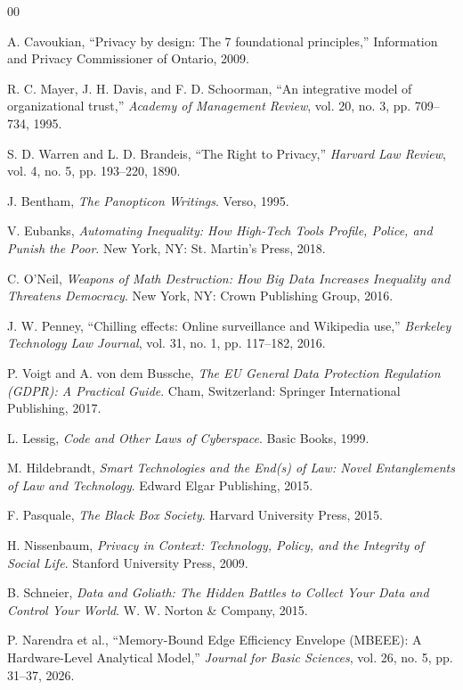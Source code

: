 \documentclass[conference]{IEEEtran}
\begin{document}
\begin{thebibliography}{00}

 A. Cavoukian, ``Privacy by design: The 7 foundational principles,'' Information and Privacy Commissioner of Ontario, 2009.

 R. C. Mayer, J. H. Davis, and F. D. Schoorman, ``An integrative model of organizational trust,'' \textit{Academy of Management Review}, vol. 20, no. 3, pp. 709--734, 1995.

 S. D. Warren and L. D. Brandeis, ``The Right to Privacy,'' \textit{Harvard Law Review}, vol. 4, no. 5, pp. 193--220, 1890.

 J. Bentham, \textit{The Panopticon Writings}. Verso, 1995.

 V. Eubanks, \textit{Automating Inequality: How High-Tech Tools Profile, Police, and Punish the Poor}. New York, NY: St. Martin's Press, 2018.

 C. O'Neil, \textit{Weapons of Math Destruction: How Big Data Increases Inequality and Threatens Democracy}. New York, NY: Crown Publishing Group, 2016.

 J. W. Penney, ``Chilling effects: Online surveillance and Wikipedia use,'' \textit{Berkeley Technology Law Journal}, vol. 31, no. 1, pp. 117--182, 2016.

 P. Voigt and A. von dem Bussche, \textit{The EU General Data Protection Regulation (GDPR): A Practical Guide}. Cham, Switzerland: Springer International Publishing, 2017.

 L. Lessig, \textit{Code and Other Laws of Cyberspace}. Basic Books, 1999.

 M. Hildebrandt, \textit{Smart Technologies and the End(s) of Law: Novel Entanglements of Law and Technology}. Edward Elgar Publishing, 2015.

 F. Pasquale, \textit{The Black Box Society}. Harvard University Press, 2015.

 H. Nissenbaum, \textit{Privacy in Context: Technology, Policy, and the Integrity of Social Life}. Stanford University Press, 2009.

 B. Schneier, \textit{Data and Goliath: The Hidden Battles to Collect Your Data and Control Your World}. W. W. Norton \& Company, 2015.

 P. Narendra et al., ``Memory-Bound Edge Efficiency Envelope (MBEEE): A Hardware-Level Analytical Model,'' \textit{Journal for Basic Sciences}, vol. 26, no. 5, pp. 31--37, 2026.


\end{thebibliography}
\end{document}
